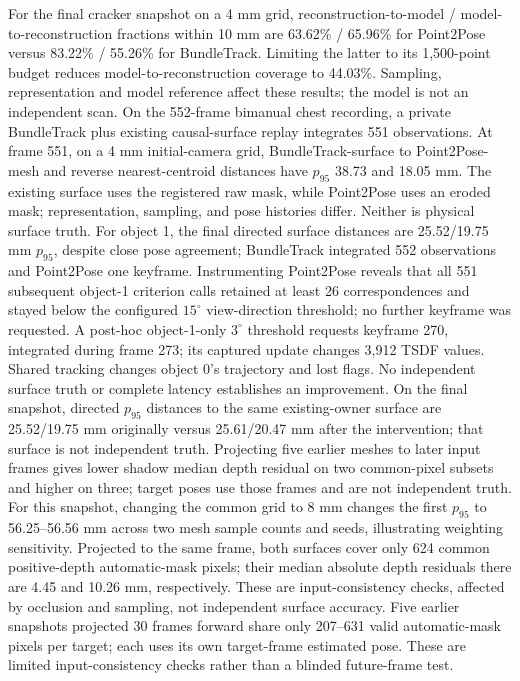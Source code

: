 \documentclass[10pt,journal]{IEEEtran}
\begin{document}
For the final cracker snapshot on a 4 mm grid, reconstruction-to-model / model-to-reconstruction fractions within 10 mm are 63.62\% / 65.96\% for Point2Pose versus 83.22\% / 55.26\% for BundleTrack. Limiting the latter to its 1,500-point budget reduces model-to-reconstruction coverage to 44.03\%. Sampling, representation and model reference affect these results; the model is not an independent scan. On the 552-frame bimanual chest recording, a private BundleTrack plus existing causal-surface replay integrates 551 observations. At frame 551, on a 4 mm initial-camera grid, BundleTrack-surface to Point2Pose-mesh and reverse nearest-centroid distances have $p_{95}$ 38.73 and 18.05 mm. The existing surface uses the registered raw mask, while Point2Pose uses an eroded mask; representation, sampling, and pose histories differ. Neither is physical surface truth. For object 1, the final directed surface distances are 25.52/19.75 mm $p_{95}$, despite close pose agreement; BundleTrack integrated 552 observations and Point2Pose one keyframe. Instrumenting Point2Pose reveals that all 551 subsequent object-1 criterion calls retained at least 26 correspondences and stayed below the configured $15^\circ$ view-direction threshold; no further keyframe was requested. A post-hoc object-1-only $3^\circ$ threshold requests keyframe 270, integrated during frame 273; its captured update changes 3,912 TSDF values. Shared tracking changes object 0's trajectory and lost flags. No independent surface truth or complete latency establishes an improvement. On the final snapshot, directed $p_{95}$ distances to the same existing-owner surface are 25.52/19.75 mm originally versus 25.61/20.47 mm after the intervention; that surface is not independent truth. Projecting five earlier meshes to later input frames gives lower shadow median depth residual on two common-pixel subsets and higher on three; target poses use those frames and are not independent truth. For this snapshot, changing the common grid to 8 mm changes the first $p_{95}$ to 56.25--56.56 mm across two mesh sample counts and seeds, illustrating weighting sensitivity. Projected to the same frame, both surfaces cover only 624 common positive-depth automatic-mask pixels; their median absolute depth residuals there are 4.45 and 10.26 mm, respectively. These are input-consistency checks, affected by occlusion and sampling, not independent surface accuracy. Five earlier snapshots projected 30 frames forward share only 207--631 valid automatic-mask pixels per target; each uses its own target-frame estimated pose. These are limited input-consistency checks rather than a blinded future-frame test.
\end{document}
